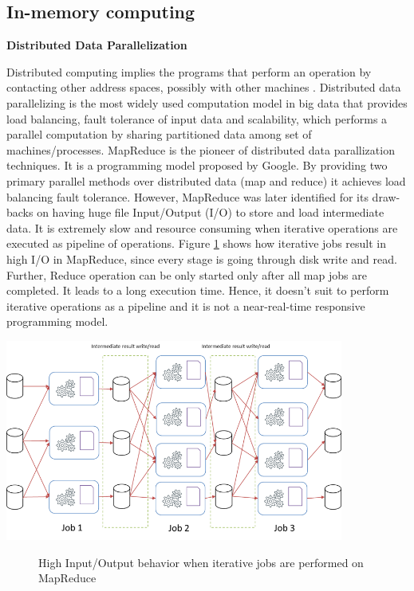\subsection{In-memory computing}

\textbf{Distributed Data Parallelization}

Distributed computing implies the programs that perform an operation by contacting other address spaces, possibly with other machines \cite{DistributedComputing}. Distributed data parallelizing is the most widely used computation model in big data that provides load balancing, fault tolerance of input data  \cite{Jackson2015517} and scalability, which performs a parallel computation by sharing partitioned data among set of machines/processes. MapReduce is the pioneer of distributed data parallization techniques. It is a programming model proposed by Google. By providing two primary parallel methods over distributed data (map and reduce) it achieves load balancing fault tolerance. However, MapReduce was later identified for its draw-backs on having huge file Input/Output (I/O) to store and load intermediate data. It is extremely slow and resource consuming when iterative operations are executed as pipeline of operations.
Figure \ref{fig:hadoop-high-io} shows how iterative jobs result in high I/O in MapReduce, since every stage is going through disk write and read. Further, Reduce operation can be only started only after all map jobs are completed. It leads to a long execution time. 
Hence, it doesn't suit to perform iterative operations as a pipeline and it is not a near-real-time responsive programming model.
\begin{center}
	\includegraphics[width=30em]{./Figures/hadoop-high-io}
	\begin{figure}[htbp]
    \caption{High Input/Output behavior when iterative jobs are performed on MapReduce}
    \label{fig:hadoop-high-io}
	\end{figure}
\end{center}
 
